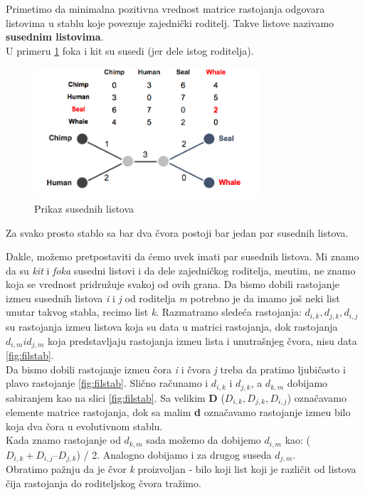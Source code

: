 Primetimo da minimalna pozitivna vrednost matrice rastojanja odgovara listovima u stablu koje povezuje zajedni\v{c}ki roditelj. Takve listove nazivamo \textbf{susednim listovima}.\\

U primeru \ref{fig:psl} foka i kit su susedi (jer dele istog roditelja).

\begin{figure}[h!]
\begin{center}
\includegraphics[width=0.75\textwidth]{poglavlja/7/slike/slika5.png}
\end{center}
\caption{Prikaz susednih listova}
\label{fig:psl}
\end{figure}

\begin{teorema}
Za svako prosto stablo sa bar dva \v{c}vora postoji bar jedan par susednih listova.
\end{teorema}
Dakle, mo\v{z}emo pretpostaviti da \'cemo uvek imati par susednih listova. Mi znamo da su \textit{kit} i \textit{foka} susedni listovi i da dele zajedni\v{c}kog roditelja, me\dj utim, ne znamo koja se vrednost pridru\v{z}uje svakoj od ovih grana. Da bismo dobili rastojanje izme\dj u susednih listova \textit{i} i \textit{j} od roditelja \textit{m} potrebno je da imamo jo\v{s} neki list unutar takvog stabla, recimo list \textit{k}. Razmatramo slede\'ca rastojanja: $d_{i,k}, d_{j, k}, d_{i,j}$ su rastojanja izme\dj u listova koja su data u matrici rastojanja, dok rastojanja $d_{i, m} i d_{j, m}$ koja predstavljaju rastojanja izme\dj u lista i unutra\v{s}njeg \v{c}vora, nisu data \ref{fig:filstab}.\\
Da bismo dobili rastojanje izme\dj u \v{c}ora \textit{i} i \v{c}vora \textit{j} treba da pratimo ljubi\v{c}asto i plavo rastojanje \ref{fig:filstab}. Sli\v{c}no ra\v{c}unamo i $d_{i, k}$ i $d_{j, k}$, a $d_{k, m}$ dobijamo sabiranjem kao na slici \ref{fig:filstab}. Sa velikim \textbf{D} ($D_{i, k}, D_{j, k}, D_{i, j}$) ozna\v{c}avamo elemente matrice rastojanja, dok sa malim \textbf{d} ozna\v{c}avamo rastojanje izme\dj u bilo koja dva \v{c}ora u evolutivnom stablu. \\
Kada znamo rastojanje od $d_{k,m}$ sada mo\v{z}emo da dobijemo $d_{i,m}$ kao: ($D_{i, k} + D_{i, j} – D_{j, k}$) / 2. Analogno dobijamo i za drugog suseda $d_{j, m}$.\\
Obratimo pa\v{z}nju da je \v{c}vor \textit{k} proizvoljan - bilo koji list koji je razli\v{c}it od listova \v{c}ija rastojanja do roditeljskog \v{c}vora tra\v{z}imo.\\

